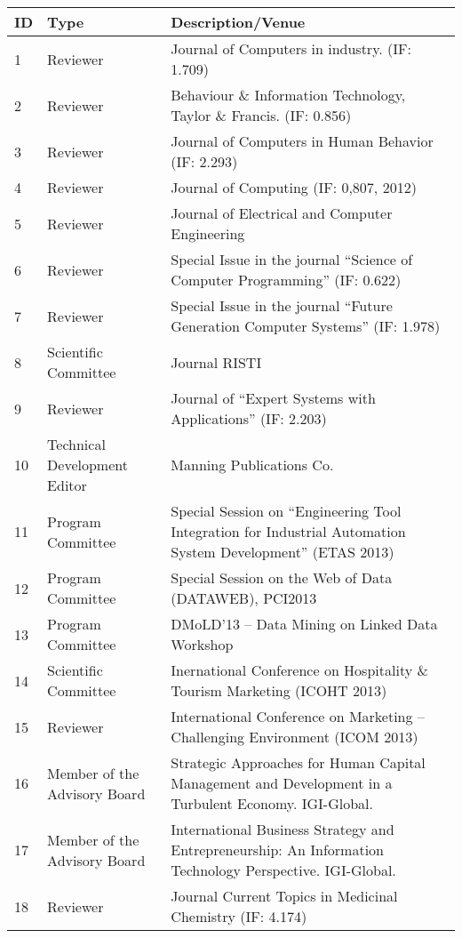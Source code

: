 \normalsize
\begin{longtable}[c]{|l|p{3.5cm}|p{10cm}|} 
\hline 
  \textbf{ID} & \textbf{Type} &  \textbf{Description/Venue}  \\\hline
\endhead
  1&Reviewer&Journal of Computers in industry. (IF: 1.709) \\ \hline
  2&Reviewer& Behaviour \& Information Technology, Taylor \& Francis.  (IF: 0.856) \\ \hline 
  3&Reviewer&Journal of Computers in Human Behavior (IF: 2.293) \\ \hline
  4&Reviewer&Journal of Computing (IF: 0,807, 2012) \\ \hline
  5&Reviewer&Journal of Electrical and Computer Engineering \\ \hline
  6&Reviewer&Special Issue in the journal ``Science of Computer Programming'' (IF: 0.622) \\ \hline
  7&Reviewer&Special Issue in the journal ``Future Generation Computer Systems'' (IF: 1.978) \\ \hline 
  8&Scientific Committee&Journal RISTI \\ \hline 
  9&Reviewer&Journal of ``Expert Systems with Applications'' (IF: 2.203) \\ \hline
  10&Technical Development Editor&Manning Publications Co. \\ \hline
  11&Program Committee&Special Session on ``Engineering Tool Integration for Industrial Automation System Development'' (ETAS 2013) \\ \hline
  12&Program Committee&Special Session on the Web of Data (DATAWEB), PCI2013 \\ \hline
  13&Program Committee&DMoLD'13 – Data Mining on Linked Data Workshop \\ \hline
  14&Scientific Committee&Inernational Conference on Hospitality \& Tourism Marketing (ICOHT 2013) \\ \hline
  15&Reviewer& International Conference on Marketing – Challenging Environment (ICOM 2013) \\ \hline
  16&Member of the Advisory Board &Strategic Approaches for Human Capital Management and Development in a Turbulent Economy. IGI-Global. \\ \hline
  17&Member of the Advisory Board&International Business Strategy and Entrepreneurship: An Information Technology Perspective. IGI-Global. \\ \hline
  18&Reviewer&Journal Current Topics in Medicinal Chemistry (IF: 4.174) \\ \hline

\end{longtable}
